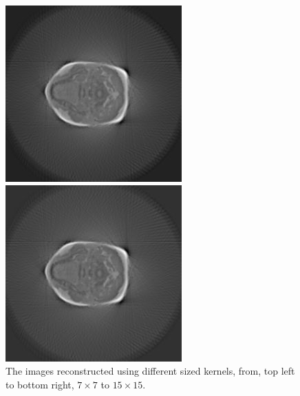\begin{figure}[ht]
            \begin{minipage}[c]{0.3\linewidth}
                \centering
                \includegraphics[width=\textwidth]{Files/report_images/SUM_backprojections_k13.jpg}
            \end{minipage}
            \begin{minipage}[c]{0.3\linewidth}
                \centering
                \includegraphics[width=\textwidth]{Files/report_images/SUM_backprojections_k15.jpg}
            \end{minipage}
            \caption{The images reconstructed using different sized kernels, from, top left to bottom right, $7\times 7$ to $15\times 15$.\label{fig:kernel_sizes}}
        \end{figure}

